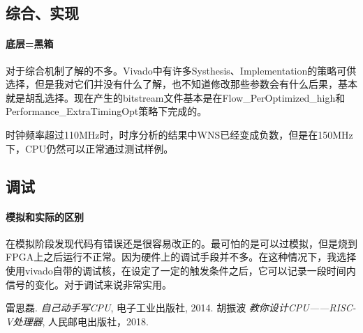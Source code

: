 \documentclass[UTF8]{ctexart}
\begin{document}
	\subsection{综合、实现}
		\paragraph{底层=黑箱} 对于综合机制了解的不多。Vivado中有许多Systhesis、Implementation的策略可供选择，但是我对它们并没有什么了解，也不知道修改那些参数会有什么后果，基本就是胡乱选择。现在产生的bitstream文件基本是在Flow\_PerOptimized\_high和Performance\_ExtraTimingOpt策略下完成的。
	
		时钟频率超过110MHz时，时序分析的结果中WNS已经变成负数，但是在150MHz下，CPU仍然可以正常通过测试样例。
	
	\subsection{调试}
		\paragraph{模拟和实际的区别} 在模拟阶段发现代码有错误还是很容易改正的。最可怕的是可以过模拟，但是烧到FPGA上之后运行不正常。因为硬件上的调试手段并不多。在这种情况下，我选择使用vivado自带的调试核，在设定了一定的触发条件之后，它可以记录一段时间内信号的变化。对于调试来说非常实用。
		
	\begin{thebibliography}{9}
		雷思磊.
		\emph{自己动手写CPU},
		电子工业出版社, 2014.
		胡振波
		\emph{教你设计CPU——RISC-V处理器},
		人民邮电出版社，2018.
	\end{thebibliography}
	
\end{document}
